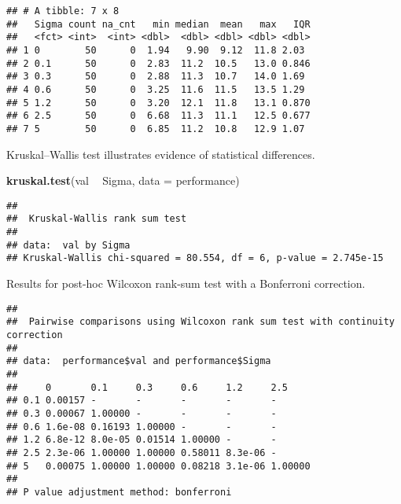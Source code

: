 \documentclass[]{book}
\newenvironment{Shaded}{\begin{snugshade}}{\end{snugshade}}
\newcommand{\DataTypeTok}[1]{\textcolor[rgb]{0.13,0.29,0.53}{#1}}
\newcommand{\KeywordTok}[1]{\textcolor[rgb]{0.13,0.29,0.53}{\textbf{#1}}}
\newcommand{\NormalTok}[1]{#1}
\newcommand{\OperatorTok}[1]{\textcolor[rgb]{0.81,0.36,0.00}{\textbf{#1}}}
\newcommand{\OtherTok}[1]{\textcolor[rgb]{0.56,0.35,0.01}{#1}}
\newcommand{\StringTok}[1]{\textcolor[rgb]{0.31,0.60,0.02}{#1}}
\begin{document}
\begin{verbatim}
## # A tibble: 7 x 8
##   Sigma count na_cnt   min median  mean   max   IQR
##   <fct> <int>  <int> <dbl>  <dbl> <dbl> <dbl> <dbl>
## 1 0        50      0  1.94   9.90  9.12  11.8 2.03 
## 2 0.1      50      0  2.83  11.2  10.5   13.0 0.846
## 3 0.3      50      0  2.88  11.3  10.7   14.0 1.69 
## 4 0.6      50      0  3.25  11.6  11.5   13.5 1.29 
## 5 1.2      50      0  3.20  12.1  11.8   13.1 0.870
## 6 2.5      50      0  6.68  11.3  11.1   12.5 0.677
## 7 5        50      0  6.85  11.2  10.8   12.9 1.07
\end{verbatim}

Kruskal--Wallis test illustrates evidence of statistical differences.

\begin{Shaded}
\begin{Highlighting}[]
\KeywordTok{kruskal.test}\NormalTok{(val }\OperatorTok{~}\StringTok{ }\NormalTok{Sigma, }\DataTypeTok{data =}\NormalTok{ performance)}
\end{Highlighting}
\end{Shaded}

\begin{verbatim}
## 
##  Kruskal-Wallis rank sum test
## 
## data:  val by Sigma
## Kruskal-Wallis chi-squared = 80.554, df = 6, p-value = 2.745e-15
\end{verbatim}

Results for post-hoc Wilcoxon rank-sum test with a Bonferroni correction.

\begin{Shaded}
\end{Shaded}

\begin{verbatim}
## 
##  Pairwise comparisons using Wilcoxon rank sum test with continuity correction 
## 
## data:  performance$val and performance$Sigma 
## 
##     0       0.1     0.3     0.6     1.2     2.5    
## 0.1 0.00157 -       -       -       -       -      
## 0.3 0.00067 1.00000 -       -       -       -      
## 0.6 1.6e-08 0.16193 1.00000 -       -       -      
## 1.2 6.8e-12 8.0e-05 0.01514 1.00000 -       -      
## 2.5 2.3e-06 1.00000 1.00000 0.58011 8.3e-06 -      
## 5   0.00075 1.00000 1.00000 0.08218 3.1e-06 1.00000
## 
## P value adjustment method: bonferroni
\end{verbatim}
\end{document}
